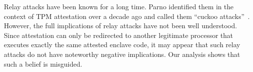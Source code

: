 
Relay attacks have been known for a long time. Parno identified them in the context of TPM attestation over a decade ago and called them ``cuckoo attacks''~\cite{parno2008bootstrapping}. However, the full implications of relay attacks have not been well understood. Since attestation can only be redirected to another legitimate processor that executes exactly the same attested enclave code, it may appear that such relay attacks do not have noteworthy negative implications. Our analysis shows that such a belief is misguided.


